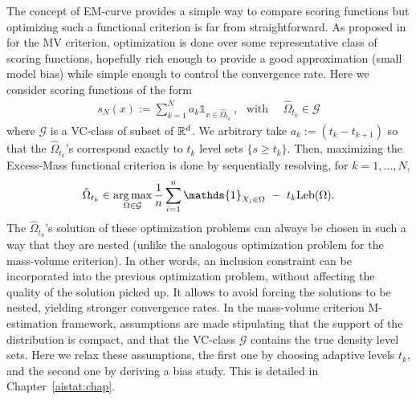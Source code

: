 The concept of EM-curve provides a simple way to compare scoring functions but optimizing such a functional criterion is far from straightforward. As proposed in \cite{CLEM13} for the MV criterion,
optimization is done over some representative class of scoring functions, hopefully rich enough to provide a good approximation (small model bias) while simple enough to control the convergence rate. Here we consider scoring functions of the form
\begin{align*}
s_N(x):= \sum_{k=1}^N a_k \mathds{1}_{x \in \hat{\Omega}_{t_k} }~, ~~~\text{with ~~~} \hat{\Omega}_{t_k}  \in \mathcal{G}
\end{align*}
where $\mathcal{G}$ is a VC-class of subset of $\mathbb{R}^d$.
We arbitrary take $a_k:= (t_k-t_{k+1})$ so that the $\hat{\Omega}_{t_k}$'s correspond exactly to $t_k$ level sets $\{s \ge t_k\}$. Then, maximizing the Excess-Mass functional criterion is done by sequentially resolving, for $k=1,\ldots,N$,
\begin{align*}
\hat \Omega_{t_k} \in \argmax_{\Omega \in \mathcal{G}} \frac{1}{n}\sum_{i=1}^n\mathds{1}_{X_i \in \Omega}~-~t_k \leb(\Omega).
\end{align*}
The $\hat \Omega_{t_k}$'s solution of these optimization problems can always be chosen in such a way that they are nested (unlike the analogous optimization problem for the mass-volume criterion). In other words, an inclusion constraint can be incorporated into the previous optimization problem, without affecting the quality of the solution picked up. It allows to avoid forcing the solutions to be nested, yielding stronger convergence rates.
In the mass-volume criterion M-estimation framework, assumptions are made stipulating that the support of the distribution is compact, and that the VC-class $\mathcal{G}$ contains the true density level sets. Here we relax these assumptions, the first one by choosing adaptive levels $t_k$, and the second one by deriving a bias study. This is detailed in Chapter~\ref{aistat:chap}.
